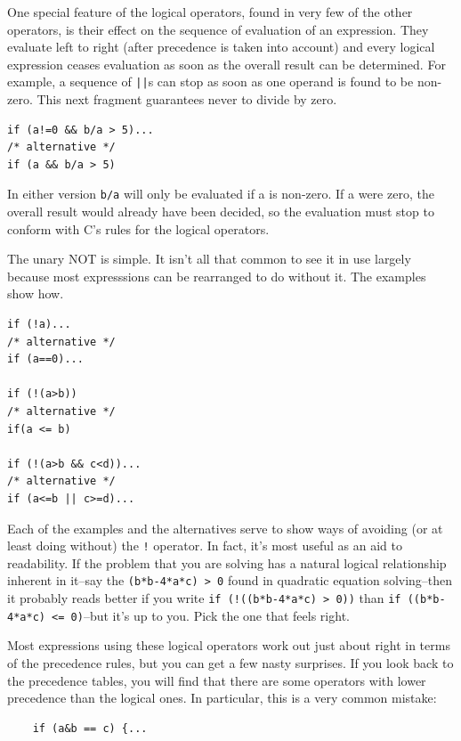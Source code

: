   One special feature of the logical operators, found in very few of the
   other operators, is their effect on the sequence of evaluation of an
   expression. They evaluate left to right (after precedence is taken into
   account) and every logical expression ceases evaluation as soon as the
   overall result can be determined. For example, a sequence of
   \texttt{||}s can stop as soon as one operand is found to be non-zero.
   This next fragment guarantees never to divide by zero.


  \begin{Verbatim}
if (a!=0 && b/a > 5)...
/* alternative */
if (a && b/a > 5)
\end{Verbatim}

  In either version \texttt{b/a} will only be evaluated if a is
   non-zero. If a were zero, the overall result would already have been
   decided, so the evaluation must stop to conform with C's rules for the
   logical operators.


  The unary NOT is simple. It isn't all that common to see it in use
   largely because most expresssions can be rearranged to do without it. The
   examples show how.


  \begin{Verbatim}
if (!a)...
/* alternative */
if (a==0)...

if (!(a>b))
/* alternative */
if(a <= b)

if (!(a>b && c<d))...
/* alternative */
if (a<=b || c>=d)...
\end{Verbatim}

  Each of the examples and the alternatives serve to show ways of avoiding
   (or at least doing without) the \texttt{!} operator. In fact, it's most
   useful as an aid to readability. If the problem that you are solving has a
   natural logical relationship inherent in it--say the \texttt{(b*b-4*a*c)
   > 0} found in quadratic equation solving--then it probably
   reads better if you write \texttt{if (!((b*b-4*a*c) > 0))} than
   \texttt{if ((b*b-4*a*c) <= 0)}--but it's up to you. Pick the one
   that feels right.


  Most expressions using these logical operators work out just about right
   in terms of the precedence rules, but you can get a few nasty surprises. If
   you look back to the precedence tables, you will find that there are some
   operators with lower precedence than the logical ones. In particular, this
   is a very common mistake:


  \begin{Verbatim}
    if (a&b == c) {...
    \end{Verbatim}

